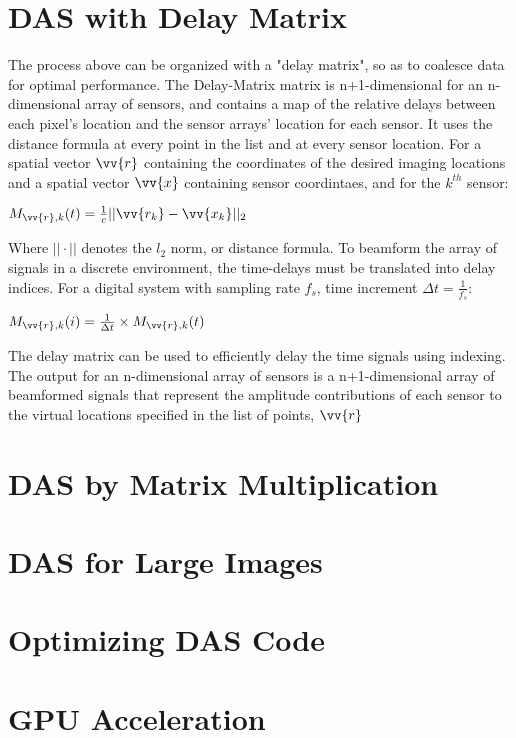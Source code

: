 \section{DAS with Delay Matrix}
\label{chapter2:delay_matrix}

The process above can be organized with a "delay matrix", so as to coalesce data for optimal performance. The Delay-Matrix matrix is n+1-dimensional for an n-dimensional array of sensors, and contains a map of the relative delays between each pixel's location and the sensor arrays' location for each sensor. It uses the distance formula at every point in the list and at every sensor location. For a spatial vector $\vv{r}$ containing the coordinates of the desired imaging locations and a spatial vector $\vv{x}$ containing sensor coordintaes, and for the $k^{th}$ sensor: 

$M_{\vv{r},k}(t) = \frac{1}{c} || \vv{r_k} - \vv{x_k}||_2$

Where $||\cdot||$ denotes the $l_2$ norm, or distance formula. To beamform the array of signals in a discrete environment, the time-delays must be translated into delay indices. For a digital system with sampling rate $f_s$, time increment $\Delta{t} = \frac{1}{f_s}$:

$M_{\vv{r},k}(i) = \frac{1}{\Delta{t}} \times M_{\vv{r},k}(t)$

The delay matrix can be used to efficiently delay the time signals using indexing. The output for an n-dimensional array of sensors is a n+1-dimensional array of beamformed signals that represent the amplitude contributions of each sensor to the virtual locations specified in the list of points, $\vv{r}$

\section{DAS by Matrix Multiplication}
\label{chapter2:mmult_das}

\section{DAS for Large Images}
\label{chapter2:large_images}

\section{Optimizing DAS Code}
\label{chapter2:optimizing}

\section{GPU Acceleration}
\label{chapter2:gpu_accel}
